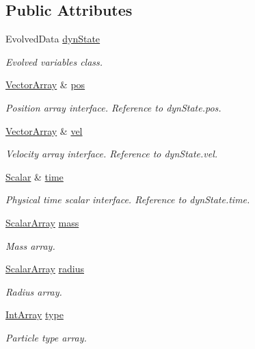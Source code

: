 \subsection*{Public Attributes}
\begin{DoxyCompactItemize}
\item 
Evolved\+Data \mbox{\hyperlink{classparticle_system_a68651a7d05d0799f3eda4e785fcec725}{dyn\+State}}
\begin{DoxyCompactList}\small\item\em Evolved variables class. \end{DoxyCompactList}\item 
\mbox{\hyperlink{classparticle_system_a6f66ed187a286c0d42ab2f83b8b6193b}{Vector\+Array}} \& \mbox{\hyperlink{classparticle_system_ae845daf120c9ad16dea4f2ca1df5b11a}{pos}}
\begin{DoxyCompactList}\small\item\em Position array interface. Reference to dyn\+State.\+pos. \end{DoxyCompactList}\item 
\mbox{\hyperlink{classparticle_system_a6f66ed187a286c0d42ab2f83b8b6193b}{Vector\+Array}} \& \mbox{\hyperlink{classparticle_system_a545da170c4d59f18c6ddb18817cb5f3e}{vel}}
\begin{DoxyCompactList}\small\item\em Velocity array interface. Reference to dyn\+State.\+vel. \end{DoxyCompactList}\item 
\mbox{\hyperlink{classparticle_system_a28e49da72c0ca5786d0611e6128a8994}{Scalar}} \& \mbox{\hyperlink{classparticle_system_a2edb9719905f209d84079450c1a01280}{time}}
\begin{DoxyCompactList}\small\item\em Physical time scalar interface. Reference to dyn\+State.\+time. \end{DoxyCompactList}\item 
\mbox{\hyperlink{classparticle_system_af7f328120ff85c8b34edeed4a68b746e}{Scalar\+Array}} \mbox{\hyperlink{classparticle_system_ada52f9d5fc33ca23a9ab6dee96d88957}{mass}}
\begin{DoxyCompactList}\small\item\em Mass array. \end{DoxyCompactList}\item 
\mbox{\hyperlink{classparticle_system_af7f328120ff85c8b34edeed4a68b746e}{Scalar\+Array}} \mbox{\hyperlink{classparticle_system_a8f1ca1c5c748549b9b1fc57cb9bd01a0}{radius}}
\begin{DoxyCompactList}\small\item\em Radius array. \end{DoxyCompactList}\item 
\mbox{\hyperlink{classparticle_system_aee9dc82f46ce17a477251805094cf19f}{Int\+Array}} \mbox{\hyperlink{classparticle_system_afafaf8f74705b4f569be8d7e4d78aa4f}{type}}
\begin{DoxyCompactList}\small\item\em Particle type array. \end{DoxyCompactList}\end{DoxyCompactItemize}
